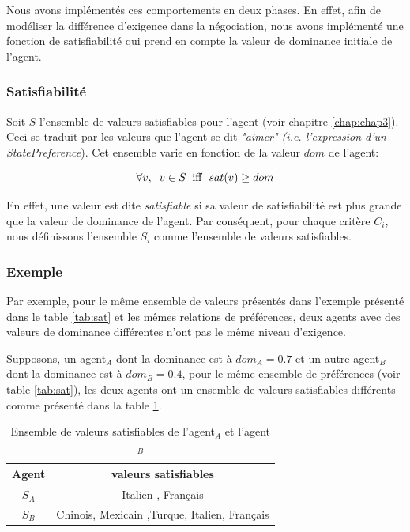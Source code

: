 	Nous avons implémentés ces comportements en deux phases. En effet, afin de modéliser la différence d'exigence dans la négociation, nous avons implémenté une fonction de satisfiabilité qui prend en compte la valeur de dominance initiale de l'agent. 
	
	\subsubsection{Satisfiabilité}
	
	Soit $S$ l'ensemble de valeurs satisfiables pour l'agent (voir chapitre \ref{chap:chap3}). Ceci se traduit par les valeurs que l'agent se dit \textit{"aimer" (i.e. l'expression d'un } \emph{StatePreference}). Cet ensemble varie en fonction de la valeur $dom$ de l'agent:
	
	\begin{equation}
	\forall v,\hspace{2mm} v\in S\hspace{2mm}\mathrm{iff}\hspace{2mm}sat(v) \geq dom
	\end{equation}
	
	En effet, une valeur est dite \textit{satisfiable} si sa valeur de satisfiabilité est plus grande que la valeur de dominance de l'agent.
	Par conséquent, pour chaque critère $C_i$, nous définissons l'ensemble $S_i$ comme l'ensemble de valeurs satisfiables. 
	
	\subsubsection{Exemple}	
	Par exemple, pour le même ensemble de valeurs présentés dans l'exemple présenté dans le table \ref{tab:sat} et les mêmes relations de préférences, deux agents avec des valeurs de dominance différentes n'ont pas le même niveau d'exigence. 
	
	Supposons, un agent$_A$ dont la dominance est à $dom_A=0.7$ et un autre agent$_B$ dont la dominance est à $dom_B=0.4$, pour le même ensemble de préférences (voir table \ref{tab:sat}), les deux agents ont un ensemble de valeurs satisfiables différents comme présenté dans la table \ref{tab:exSat}.
	
	\begin{table}[h]
		\centering
		{\scriptsize
			\begin{tabular}{ |c|c| }
				\hline
				\textbf{Agent} & \textbf{valeurs satisfiables} \\
				\hline				
				$S_A$ & Italien , Français \\
				\hline
				
				$S_B$ & Chinois,  Mexicain ,Turque, Italien, Français\\
				\hline
				
			\end{tabular}}
			\caption{Ensemble de valeurs satisfiables de l'agent$_A$ et l'agent $_B$}
			\label{tab:exSat}
		\end{table}

